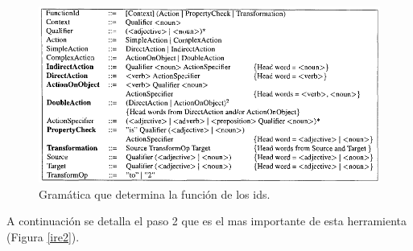 \documentclass[12pt]{report}
\begin{document}
\begin{figure}[t] %
\centering
\includegraphics[scale= 0.70]{./ire_3.png}
\caption{Gramática que determina la función de los ids.}
\label{ire3}
\end{figure}

A continuación se detalla el paso 2 que es el mas importante de esta herramienta (Figura \ref{ire2}).
\end{document}

